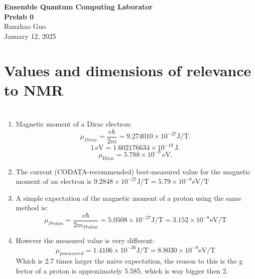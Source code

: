 \documentclass[11pt]{article}
\newcommand{\courseName}{Ensemble Quantum Computing Laborator}     %
\newcommand{\assignmentTitle}{Prelab 0} %
\newcommand{\studentName}{Runzhao Guo}       %
\newcommand{\Date}{January 12, 2025}   %
\begin{document}
\begin{center}
    {\large \textbf{\courseName}} \\
    \vspace{3pt}
    {\Large \textbf{\assignmentTitle}} \\
    \vspace{3pt}
    \studentName \\
    \vspace{3pt}
    \Date
\end{center}

\vspace{0.5in} %


\section*{Values and dimensions of relevance to NMR}

\section{} 
\begin{enumerate}[label=\alph*)]
    \item Magnetic moment of a Dirac electron: 
    \[
        \mu_{Dirac} = \frac{e \hbar}{2m} = 9.274010 \times 10^{-27} \text{J/T}.
    \]
    \[
        1\,\text{eV} = 1.602176634 \times 10^{-19}\,\text{J}.
    \]
    \[
        \mu_{\mathrm{Dirac}} = 5.788 \times 10^{-8}\,\text{eV}.
    \]


    \item The current (CODATA-recommended) best-measured value for the magnetic moment of an electron is $9.2848 \times 10^{-27} \text{J/T} = 5.79 \times10^{-8} \text{eV/T}$
    \item A simple expectation of the magnetic moment of a proton using the same method is:
    \[
        \mu_{Proton} = \frac{e \hbar}{2m_{Proton}} = 5.0508 \times 10^{-27} \text{J/T} = 3.152 \times 10 ^{-8} \text{eV/T}
    \]
    \item However the measured value is very different:
    \[
        \mu_{p measured} = 1.4106 \times 10^{-26} \text{J/T} = 8.8030 \times 10^{-8} \text{eV/T}
    \]
    Which is 2.7 times larger the naive expectation, the reason to this is the g fector of a proton is approximately 5.585, which is way bigger then 2.
\end{enumerate}
\end{document}
